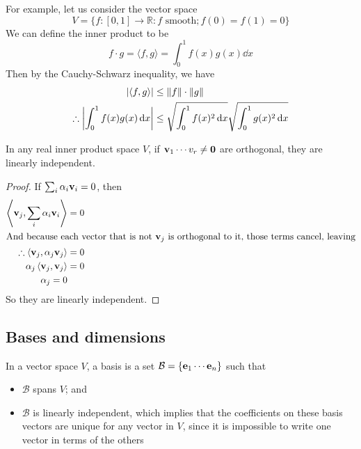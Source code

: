 For example, let us consider the vector space
\[
	V = \{ f: [0, 1] \to \mathbb R: f \text{ smooth}; f(0) = f(1) = 0 \}
\]
We can define the inner product to be
\[
	f \cdot g = \langle f, g \rangle = \int_0^1 f(x)g(x)\dd{x}
\]
Then by the Cauchy-Schwarz inequality, we have
\begin{align*}
	\abs{\langle f, g \rangle}               & \leq \norm{f} \cdot \norm{g}                                    \\
	\therefore \abs{\int_0^1 f(x)g(x)\dd{x}} & \leq \sqrt{\int_0^1 f(x)^2 \dd{x}}\sqrt{\int_0^1 g(x)^2 \dd{x}}
\end{align*}

\begin{lemma}
	In any real inner product space \(V\), if \(\vb v_1 \cdots v_r \neq \vb 0\) are orthogonal, they are linearly independent.
\end{lemma}
\begin{proof}
	If \(\sum_i \alpha_i \vb v_i = 0\), then
	\begin{align*}
		\left\langle \vb v_j, \sum_i \alpha_i \vb v_i \right\rangle     & = 0 \\
		\intertext{And because each vector that is not \(\vb v_j\) is orthogonal to it, those terms cancel, leaving}
		\therefore \left\langle \vb v_j, \alpha_j \vb v_j \right\rangle & = 0 \\
		\alpha_j \left\langle \vb v_j, \vb v_j \right\rangle            & = 0 \\
		\alpha_j = 0
	\end{align*}
	So they are linearly independent.
\end{proof}

\subsection{Bases and dimensions}
In a vector space \(V\), a basis is a set \(\mathcal B = \{ \vb e_1 \cdots \vb e_n \}\) such that
\begin{itemize}
	\item \(\mathcal B\) spans \(V\); and
	\item \(\mathcal B\) is linearly independent, which implies that the coefficients on these basis vectors are unique for any vector in \(V\), since it is impossible to write one vector in terms of the others
\end{itemize}

